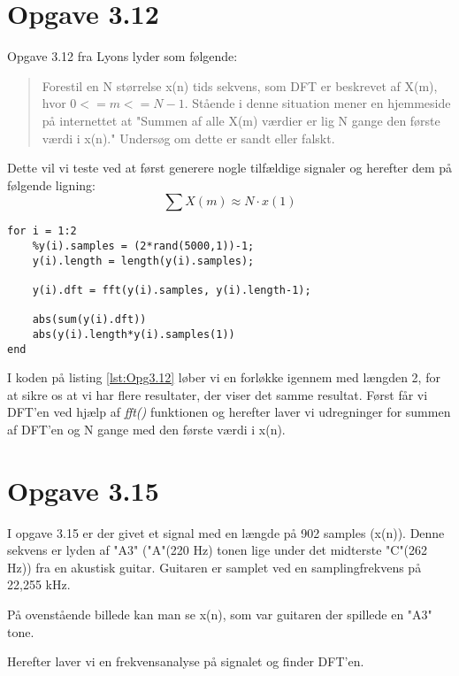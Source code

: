 \documentclass[../main.tex]{subfiles}
\begin{document}
\section{Opgave 3.12}
Opgave 3.12 fra Lyons lyder som følgende:
\begin{quote}
    Forestil en N størrelse x(n) tids sekvens, som DFT er beskrevet af X(m), hvor $0 <= m <= N-1$. 
    Stående i denne situation mener en hjemmeside på internettet at "Summen af alle X(m) værdier er lig N gange den første værdi i x(n)." 
    Undersøg om dette er sandt eller falskt.
\end{quote}

Dette vil vi teste ved at først generere nogle tilfældige signaler og herefter dem på følgende ligning:
\[
    \sum X(m) \approx N \cdot x(1)    
\]

\begin{lstlisting}[caption=MatLab kode til udregning af problematikken fra 3.12, label=lst:Opg3.12]
for i = 1:2
    %y(i).samples = (2*rand(5000,1))-1;
    y(i).length = length(y(i).samples);
    
    y(i).dft = fft(y(i).samples, y(i).length-1);
    
    abs(sum(y(i).dft))
    abs(y(i).length*y(i).samples(1))
end    
\end{lstlisting}

I koden på listing \ref{lst:Opg3.12} løber vi en forløkke igennem med længden 2, for at sikre os at vi har flere resultater, der viser det samme resultat.
Først får vi DFT'en ved hjælp af \textit{fft()} funktionen og herefter laver vi udregninger for summen af DFT'en og N gange med den første værdi i x(n).

\section{Opgave 3.15}
I opgave 3.15 er der givet et signal med en længde på 902 samples (x(n)). Denne sekvens er lyden af "A3" ("A"(220 Hz) tonen lige under det midterste "C"(262 Hz)) fra en akustisk guitar. 
Guitaren er samplet ved en samplingfrekvens på 22,255 kHz.


På ovenstående billede kan man se x(n), som var guitaren der spillede en "A3" tone.

Herefter laver vi en frekvensanalyse på signalet og finder DFT'en.

\end{document}
